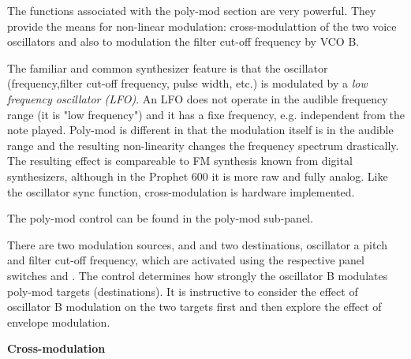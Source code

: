 The functions associated with the poly-mod section are very powerful. They provide the means for non-linear modulation: cross-modulattion of the two voice oscillators and also to modulation the filter cut-off frequency by VCO B. 

The familiar and common synthesizer feature is that the oscillator (frequency,filter  cut-off frequency, pulse width, etc.) is modulated by a \textit{low frequency oscillator (LFO)}. An LFO does not operate in the audible frequency range (it is "low frequency") and it has a fixe frequency, e.g. independent from the note played. Poly-mod is different in that the modulation itself is in the audible range and the resulting non-linearity changes the frequency spectrum drastically. The resulting effect is compareable to FM synthesis known from digital synthesizers, although in the Prophet 600 it is more raw and fully analog. Like the oscillator sync function, cross-modulation is hardware implemented.

The poly-mod control can be found in the poly-mod sub-panel. 

\begin{center}
\end{center}

There are two modulation sources, \polyenv and \oscamt and two destinations, oscillator a pitch and filter cut-off frequency, which are activated using the respective panel switches \plyfreqa and \plyfilter. The \oscamt control determines how strongly the oscillator B modulates poly-mod targets (destinations). It is instructive to consider the effect of oscillator B modulation on the two targets first and then explore the effect of envelope modulation.

\textbf{Cross-modulation}

